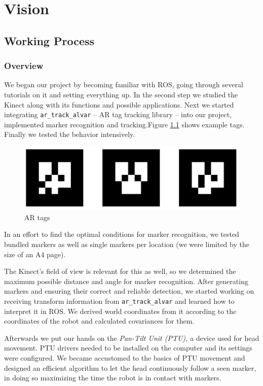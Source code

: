 \chapter{Vision}

\section{Working Process}
\subsection{Overview}

We began our project by becoming familiar with ROS, going through  several tutorials on it and setting everything up. In the second step we studied the Kinect along with its functions and possible applications. Next we started integrating \texttt{ar\_track\_alvar} -- AR tag tracking library -- into our project, implemented marker recognition and tracking.Figure \ref{AR tags} shows example tags. Finally we tested the behavior intensively. \\
\begin{figure}
\begin{center}
\includegraphics[width=\linewidth]{graphics/markers.png}
\caption{AR tags}
\label{AR tags}
\end{center}
\end{figure}
In an effort to find the optimal conditions for marker recognition, we tested bundled markers as well as single markers per location (we were limited by the size of an A4 page).

The Kinect's field of view is relevant for this as well, so we determined the maximum possible distance and angle for marker recognition. After generating markers and ensuring their correct and reliable detection, we started working on receiving transform information from \texttt{ar\_track\_alvar} and learned how to interpret it in ROS. We derived world coordinates from it according to the coordinates of the robot and calculated covariances for them.

Afterwards we put our hands on the \textit{Pan-Tilt Unit (PTU),} a device used for head movement. PTU drivers needed to be installed on the computer and its settings were configured. We became accustomed to the basics of PTU movement and designed an efficient algorithm to let the head continuously follow a seen marker, in doing so maximizing the time the robot is in contact with markers.

